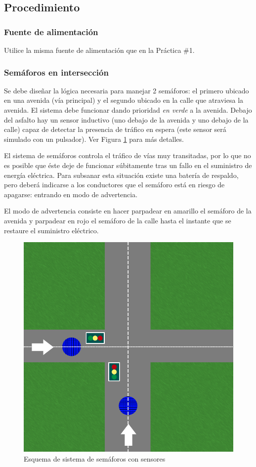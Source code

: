 \subsection{Procedimiento}
\subsubsection{Fuente de alimentación}
Utilice la misma fuente de alimentación que en la Práctica \#1.

\subsubsection{Semáforos en intersección}
Se debe diseñar la lógica necesaria para manejar 2 semáforos: el primero ubicado en una avenida (vía principal) y el segundo ubicado en la calle que atraviesa la avenida.
El sistema debe funcionar dando prioridad \emph{en verde} a la avenida. Debajo del asfalto hay un sensor inductivo (uno debajo de la avenida y uno debajo de la calle) capaz
de detectar la presencia de tráfico en espera (este sensor será simulado con un pulsador). Ver Figura \ref{Fig:Semaforos} para más detalles.

El sistema de semáforos controla el tráfico de vías muy transitadas, por lo que no es posible que éste deje de funcionar súbitamente tras un fallo en el suministro de energía eléctrica.
Para subsanar esta situación existe una batería de respaldo, pero deberá indicarse a los conductores que el semáforo está en riesgo de apagarse: entrando en modo de advertencia.

El modo de advertencia consiste en hacer parpadear en amarillo el semáforo de la avenida y parpadear en rojo el semáforo de la calle hasta el instante que se restaure el 
suministro eléctrico.

\begin{figure}[H]
    \centering
    \includegraphics[scale=0.4]{images/Semaforos.png}
    \caption{Esquema de sistema de semáforos con sensores}
    \label{Fig:Semaforos}
\end{figure}

